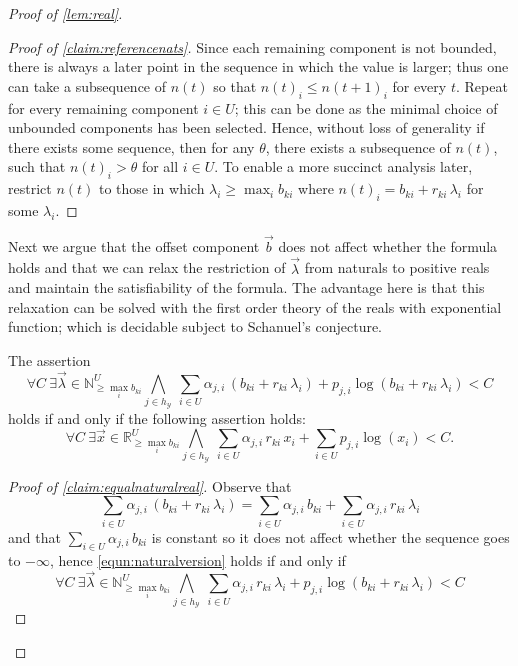 \documentclass{lmcs}
\theoremstyle{plain}
\theoremstyle{definition}
\theoremstyle{remark}
\newenvironment{subproof}[1][\proofname]{\renewcommand{\qedsymbol}{{$\blacksquare$}}\begin{proof}[#1]}{\end{proof}}
\newcommand\revar{x}
\newcommand\revec{\vec{x}}
\newcommand\basevecraw{b}
\newcommand\basevec{\vec{\basevecraw}}
\newcommand\pvecraw{r}
\begin{document}
\begin{proof}[Proof of \cref{lem:real}]
\begin{subproof}[Proof of \cref{claim:referencenats}]
Since each remaining component is not bounded, there is always a later point in the sequence in which the value is larger; thus one can take a subsequence of $n(t)$ so that $n(t)_i \le n(t+1)_i$ for every $t$. Repeat for every remaining component $i \in U$; this can be done as  the minimal choice of unbounded components has been selected. Hence, without loss of generality if there exists some sequence, then for any $\theta$, there exists a subsequence of $n(t)$, such that $n(t)_i > \theta$ for all $i \in U$. To enable a more succinct analysis later, restrict $n(t)$ to those in which $\lambda_i \ge \max_i{\basevecraw_{ki}}$ where $n(t)_i = \basevecraw_{ki} + \pvecraw_{ki} \, \lambda_i$ for some $\lambda_i$.\end{subproof}

Next we argue that the offset component $\basevec$ does not affect whether the formula holds and that  we can relax the restriction of $\vec{\lambda}$ from naturals to positive reals and maintain the satisfiability of the formula.  The advantage here is that this relaxation can be solved with the first order theory of the reals with exponential function; which is decidable subject to Schanuel's conjecture.

\begin{clm}\label{claim:equalnaturalreal}The assertion
\begin{equation}\label{equn:naturalversion}
\forall C\  \exists \vec{\lambda} \in \mathbb{N}^{U}_{\ge \max_i{\basevecraw_{ki}}}
\bigwedge_{j \in h_\mathcal{Y}}\ \sum_{i \in U} \alpha_{j,i}\, (\basevecraw_{ki} + \pvecraw_{ki}\, \lambda_i) +  p_{j,i}\log(\basevecraw_{ki} + \pvecraw_{ki}\, \lambda_i) < C
\end{equation}
holds if and only if  the following assertion holds:
\begin{equation}\label{equn:realsversion}
\forall C\  \exists \revec \in \mathbb{R}^{U}_{\ge \max_i{\basevecraw_{ki}}}
\bigwedge_{j \in h_\mathcal{Y}}\ \sum_{i \in U} \alpha_{j,i}\, \pvecraw_{ki}\, \revar_i + \sum_{i \in U}  p_{j,i}\log(\revar_i) < C.
\end{equation}
\end{clm}

\begin{subproof}[Proof of \cref{claim:equalnaturalreal}]
Observe that \[\sum_{i \in U} \alpha_{j,i}\, (\basevecraw_{ki} + \pvecraw_{ki}\, \lambda_i) = \sum_{i \in U} \alpha_{j,i}\, \basevecraw_{ki} + \sum_{i \in U} \alpha_{j,i}\, \pvecraw_{ki}\, \lambda_i \] and that $\sum_{i \in U} \alpha_{j,i}\, \basevecraw_{ki}$ is constant so it does not affect whether the sequence goes to $-\infty$, hence \cref{equn:naturalversion}  holds if and only if
\begin{equation}
\forall C\  \exists \vec{\lambda} \in \mathbb{N}^{U}_{\ge \max_i{\basevecraw_{ki}}}
\bigwedge_{j \in h_\mathcal{Y}}\ \sum_{i \in U} \alpha_{j,i}\, \pvecraw_{ki}\, \lambda_i +  p_{j,i}\log(\basevecraw_{ki} + \pvecraw_{ki}\, \lambda_i) < C \end{equation}


\end{subproof}
\end{proof}
\end{document}
